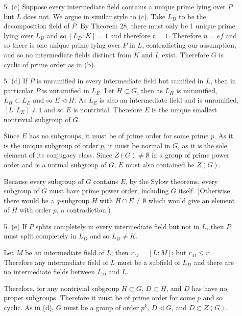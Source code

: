 \documentclass{article}
\begin{document}
\begin{enumerate}
    \item [5. (c)] Suppose every intermediate field contains a unique prime lying over $P$ but $L$ does not.  We argue in similar style to (c).  Take $L_D$ to be the decomposition field of $P$.  By Theorem 28, there must only be 1 unique prime lying over $L_D$ and so $[L_D : K] = 1$ and therefore $r = 1$.  Therefore $n = ef$ and so there is one unique prime lying over $P$ in $L$, contradicting our assumption, and so no intermediate fields distinct from $K$ and $L$ exist.  Therefore $G$ is cyclic of prime order as in (b).

    \item [5. (d)] If $P$ is unramified in every intermediate field but ramified in $L$, then in particular $P$ is unramified in $L_{E}$.  Let $H \subset G$, then as $L_{H}$ is unramified, $L_{H} \subset L_{E}$ and so $E \triangleleft H$.  As $L_{E}$ is also an intermediate field and is unramified, $[L : L_{E}] \neq 1$ and so $E$ is nontrivial.  Therefore $E$ is the unique smallest nontrivial subgroup of $G$.

    Since $E$ has no subgroups, it must be of prime order for some prime $p$.  As it is the unique subgroup of order $p$, it must be normal in $G$, as it is the sole element of its conjugacy class.  Since $Z(G) \neq \emptyset$ in a group of prime power order and is a normal subgroup of $G$, $E$ must also contained be $Z(G)$.

    Because every subgroup of $G$ contains $E$, by the Sylow theorems, every subgroup of $G$ must have prime power order, including $G$ itself.  (Otherwise there would be a $q$-subgroup $H$ with $H \cap E \neq \emptyset$ which would give an element of $H$ with order $p$, a contradiction.)

    \item [5. (e)] If $P$ splits completely in every intermediate field but not in $L$, then $P$ must split completely in $L_{D}$ and so $L_{D} \neq K$.

    Let $M$ be an intermediate field of $L$; then $r_{M} = [L : M]$; but $r_{M} \leq r$.  Therefore any intermediate field of $L$ must be a subfield of $L_{D}$ and there are no intermediate fields between $L_{D}$ and $L$.

    Therefore, for any nontrivial subgroup $H \subset G$, $D \subset H$, and $D$ has have no proper subgroups.  Therefore it must be of prime order for some $p$ and so cyclic.  As in (d), $G$ must be a group of order $p^k$, $D \triangleleft G$, and $D \subset Z(G)$.


\end{enumerate}
\end{document}
